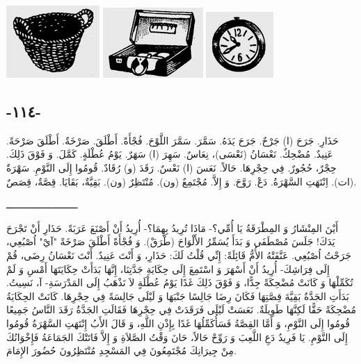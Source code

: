 \documentclass[a5paper]{article}
\begin{document}
 \includegraphics[width=1.3957in,height=1.0835in]{images/MuhammadBagauddinprettified-img308.png}   \includegraphics[width=1.5in,height=1.052in]{images/MuhammadBagauddinprettified-img309.png}   \includegraphics[width=1.0102in,height=0.9898in]{images/MuhammadBagauddinprettified-img310.png} 

\subsection{-١١٤-}
حَذَارِ. جَرَحَ (ا) جَرْحٌ. جَرَحَ يَدَهُ. سَمَّرَ. سَمَّرَ اللَّوْحَ. فُجْأَةً. أَطْلَقَ. صَرْخَةٌ. أَطْلَقَ صَرْحَةً. عَنِيدٌ. مُضْحِكٌ. نَعْسَانُ (نَعْسَى)، نِعَاسٌ. سَهِرَ (ا) سَهَرٌ. يَوْمُ عُطْلَةٍ. كَمَّلَ. وَ فَوْقَ ذَلِكَ. حِجْرٌ، حُجُورٌ. فِي حِجْرِهَا. حَالاً. نَعَسَ (ا) نَعْسٌ. رَقَدَ (و) رُقَادٌ. قُومُوا إِلَى النَّوْمِ. سَهْرَةٌ (ات). اِنْتَهَتِ السَّهْرَةُ. دَعْ. رَوَّحَ. وَ إِلاَّ. مُجْتَمِعٌ (ون). مُنْتَظِرٌ (ون). بَقِيَّةٌ، بَقَايَا. قِصَّةٌ، قِصَصٌ.

ـــــــــــــــــــــــــ

أَيْنَ المِنْشَارُ وَ المِطْرَقَةُ يَا أُمِّي؟- مَاذَا تُرِيدُ بِهِمَا؟- أُرِيدُ أَنْ أَصْنَعَ عَرَبَةً. حَذَارِ أَنْ تَجْرَحَ يَدَكَ! جَلَسَ مُصْطَفَى وَ بَدَأَ يُسَمِّرُ الأَلْوَاحَ (طْرَقْ). وَ فُجْأَةً أَطْلَقَ صَرْخَةً "آيْ" اُصْبُعِي، جَرَحْتُ اُصْبُعِي. عَنَّفَتْهُ الأُمُّ قَائِلَةً: إِنِّي قُلْتُ لَكَ: حَذَارِ، وَ أَنْتَ عَنِيدٌ. أَنْتَ نَعْسَانُ رِضَى، قُمْ إِلَى فِرَاشِكَ- أُرِيدُ أَنْ أَسْهَرَ وَ اسْتَمِعَ إِلَى حِكَايَةِ جَدَّتِنَا، إِنَّهَا بَدَأَتْ حِكَايَتَهَا أَمْسِ وَ لَمْ تُكَمِّلْهَا وَ كَانَتْ مُضْحِكَةً جِدًّا، وَ فَوْقَ ذَلِكَ غَدًا يَوْمُ عُطْلَةٍ لاَ نَذْهَبُ إِلَى المَدْرَسَةِ- آ، نَسِيتُ. بَدَأَتِ الجَدَّةُ بَقِيَّةَ قِصَّتِهَا فَكَانَ رِضَا جَالِسًا جَنْبَهَا وَ لَيْلَى جَالِسَةً فِي حِجْرِهَا. كَانَتْ الحِكَايَةُ مُضْحِكَةً حَقًّا لَكِنَّهَا طَوِيلَةٌ. نَعَسَتْ لَيْلَى فَرَقَدَتْ فِي حِجْرِهَا فَقَالَتِ الجَدَّةُ رَقَدَ النَّاسُ جَمِيعًا قُومُوا إِلَى النَّوْمِ، وَ أَمَّا القِصَّةُ فَسَأُكَمِّلُهَا غَدًا بِإِذْنِ اللَّهِ، وَ قَالَ الأَبُ إِنْتَهَتِ السَّهْرَةُ قُومُوا إِلَى النَّوْمِ. يَا فَرِيدُ دَعِ اللَّعِبَ وَ رَوِّحْ حَالاً، حَانَ وَقْتُ الصَّلاَةِ وَ إِلاَّ فَاتَتْكَ الجَمَاعَةُ فَإِخْوَانُكَ مِنْ جِيرَانِكَ مُجْتَمِعُونَ فِي المَسْجِدِ مُنْتَظِرُونَ حُضُورَ الإِمَامَ. 
\end{document}

